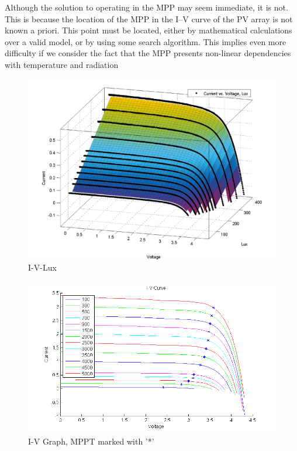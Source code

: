 Although the solution to operating in the \ac{MPP} may seem immediate, it is not. This is because the location of the \ac{MPP} in the I–V curve of the PV array is not known a priori. This point must be located, either by mathematical calculations over a valid model, or by using some search algorithm. This implies even more difficulty if we consider the fact that the \ac{MPP} presents non-linear dependencies with temperature and radiation\cite{enrique2010reliable}\\





  \begin{figure}[H]
  \begin{center}
  \includegraphics[width=\textwidth]{images/I-V-lux}
  \caption{I-V-Lux}
  \label{fig:IVgraph}
  \end{center}
  \end{figure}
  
    \begin{figure}[H]
    \begin{center}
    \includegraphics[width=\textwidth]{images/IV_lux_MPP}
    \caption{I-V Graph, MPPT marked with '*'}
    \label{fig:IV_mppgraph}
    \end{center}
    \end{figure}
  
